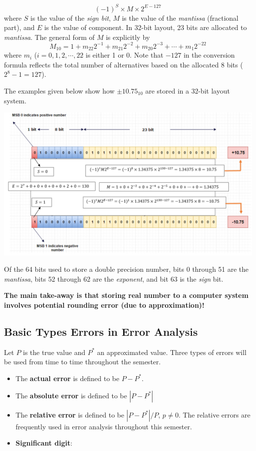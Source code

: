 \documentclass[
]{book}
\begin{document}
\[
(-1)^S\times M \times 2^{E-127}
\] where \(S\) is the value of the \emph{sign bit}, \(M\) is the value of the \emph{mantissa} (fractional part), and \(E\) is the value of component. In 32-bit layout, 23 bits are allocated to \emph{mantissa}. The general form of \(M\) is explicitly by \[
M_{10} = 1 + m_{22}2^{-1} + m_{21}2^{-2} + m_{20}2^{-3}+\cdots +m_{1}2^{-22}
\] where \(m_i\) (\(i =0, 1, 2, \cdots, 22\) is either 1 or 0. Note that \(-127\) in the conversion formula reflects the total number of alternatives based on the allocated 8 bits (\(2^8 -1 = 127\)).

The examples given below show how \(\pm 10.75_{10}\) are stored in a 32-bit layout system.

\begin{center}\includegraphics[width=0.95\linewidth]{img02/w02-32bitPattern} \end{center}

Of the 64 bits used to store a double precision number, bits 0 through 51 are the \emph{mantissa}, bits 52 through 62 are the \emph{exponent}, and bit 63 is the \emph{sign} bit.

\textbf{The main take-away is that storing real number to a computer system involves potential rounding error (due to approximation)!}

\hypertarget{basic-types-errors-in-error-analysis}{%
\subsection{Basic Types Errors in Error Analysis}\label{basic-types-errors-in-error-analysis}}

Let \(P\) is the true value and \(P^*\) an approximated value. Three types of errors will be used from time to time throughout the semester.

\begin{itemize}
\item
  The \textbf{actual error} is defined to be \(P-P^*\).
\item
  The \textbf{absolute error} is defined to be \(|P-P^*|\)
\item
  The \textbf{relative error} is defined to be \(|P-P^*|/P\), \(p \ne 0\). The relative errors are frequently used in error analysis throughout this semester.
\item
  \textbf{Significant digit}:
\end{itemize}
\end{document}
